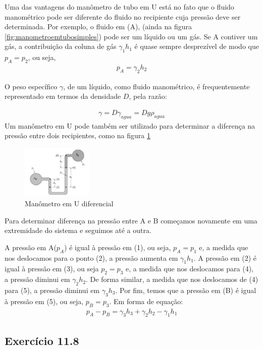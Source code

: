 \documentclass{article}
\begin{document}
Uma das vantagens do manômetro de tubo em U está no fato que o fluido manométrico pode ser diferente do fluido no recipiente cuja pressão deve ser determinada. Por exemplo, o fluido em (A), (ainda na figura \ref{fig:manometroemtubosimples}) pode ser um líquido ou um gás. Se A contiver um gás, a contribuição da coluna de gás $\gamma_1 h_1$ é quase sempre desprezível de modo que $p_A=p_2$, ou seja, 
\begin{align*}
p_A=\gamma_2 h_2
\end{align*}

O peso específico $\gamma$, de um líquido, como fluido manométrico, é frequentemente representado em termos da densidade $D$, pela razão:

\begin{align}
     \gamma = D\gamma_{agua} = Dg\rho_{agua}
\end{align}
Um manômetro em U pode também ser utilizado para determinar a diferença na pressão entre dois recipientes, como na figura \ref{fig:manometroemtubodiferencial}

\begin{figure}[!h]
     \centering 
     \includegraphics[width=0.3\textwidth]{manometroemtubodiferencial.jpg} 
     \caption{Manômetro em U diferencial} 
     \label{fig:manometroemtubodiferencial} 
\end{figure}
Para determinar diferença na pressão entre A e B começamos novamente em uma extremidade do sistema e seguimos até a outra.

A pressão em A($p_A$) é igual à pressão em (1), ou seja, $p_A = p_1$ e, a medida que nos deslocamos para o ponto (2), a pressão aumenta em $\gamma_1 h_1$. A pressão em (2) é igual à pressão em (3), ou seja $p_2 = p_3$ e, a medida que nos deslocamos para (4), a pressão diminui em $\gamma_2 h_2$. De forma similar, a medida que nos deslocamos de (4) para (5), a pressão diminui em $\gamma_3 h_3$. Por fim, temos que a pressão em (B) é igual à pressão em (5), ou seja, $p_B=p_3$. Em forma de equação:
\begin{align*}
\boxed{p_A-p_B=\gamma_3 h_3 + \gamma_2 h_2 - \gamma_1 h_1}
\end{align*}
\newpage
\subsection{Exercício 11.8} 
\end{document}
